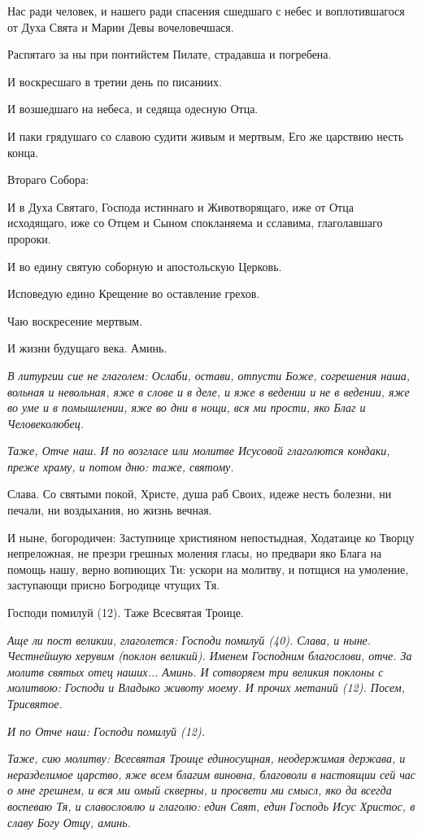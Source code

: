 Нас ради человек, и нашего ради спасения сшедшаго с небес и воплотившагося от Духа Свята и Марии Девы вочеловечшася.

Распятаго за ны при понтийстем Пилате, страдавша и погребена.

И воскресшаго в третии день по писаниих.

И возшедшаго на небеса, и седяща одесную Отца.

И паки грядушаго со славою судити живым и мертвым, Его же царствию несть конца.

Втораго Собора:

И в Духа Святаго, Господа истиннаго и Животворящаго, иже от Отца исходящаго, иже со Отцем и Сыном спокланяема и сславима, глаголавшаго пророки.

И во едину святую соборную и апостольскую Церковь.

Исповедую едино Крещение во оставление грехов.

Чаю воскресение мертвым.

И жизни будущаго века. Аминь.


\itshape В литургии сие не глаголем:\normalfont{} Ослаби, остави, отпусти Боже, согрешения наша, вольная и невольная, яже в слове и в деле, и яже в ведении и не в ведении, яже во уме и в помышлении, яже во дни в нощи, вся ми прости, яко Благ и Человеколюбец.


\itshape Таже, Отче наш. И по возгласе или молитве Исусовой глаголются кондаки, преже храму, и потом дню: таже, святому.\normalfont{} 

Слава. Со святыми покой, Христе, душа раб Своих, идеже несть болезни, ни печали, ни воздыхания, но жизнь вечная.

И ныне, богородичен: Заступнице християном непостыдная, Ходатаице ко Творцу непреложная, не презри грешных моления гласы, но предвари яко Блага на помощь нашу, верно вопиющих Ти: ускори на молитву, и потщися на умоление, заступающи присно Богродице чтущих Тя. 

Господи помилуй (12). Таже Всесвятая Троице.


\itshape Аще ли пост великии, глаголется:\normalfont{} Господи помилуй (40). Слава, и ныне. Честнейшую херувим (поклон великий). Именем Господним благослови, отче. За молитв святых отец наших... Аминь. И сотворяем три великия поклоны с молитвою: Господи и Владыко животу моему. И прочих метаний (12). Посем, Трисвятое.


\itshape И по Отче наш:\normalfont{} Господи помилуй (12).


\itshape Таже, сию молитву:\normalfont{} Всесвятая Троице единосущная, неодержимая держава, и неразделимое царство, яже всем благим виновна, благоволи в настоящии сей час о мне грешнем, и вся ми омый скверны, и просвети ми смысл, яко да всегда воспеваю Тя, и славословлю и глаголю: един Свят, един Господь Исус Христос, в славу Богу Отцу, аминь. 

